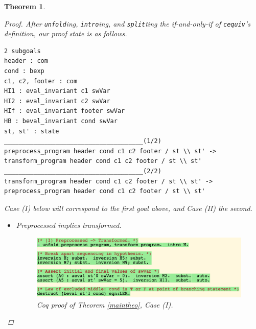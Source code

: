 \documentclass[12pt,notitlepage]{report}
\theoremstyle{plain}
\newtheorem{theo}{Theorem}[section]
\theoremstyle{definition}
\numberwithin{equation}{section}
\begin{document}
\begin{theo}
\begin{proof}
    \noindent After \verb$unfold$ing, \verb$intro$ing, and \verb$split$ting the if-and-only-if of \verb$cequiv$'s definition, our proof state is as follows.
    
    \begin{verbatim}
2 subgoals
header : com
cond : bexp
c1, c2, footer : com
HI1 : eval_invariant c1 swVar
HI2 : eval_invariant c2 swVar
HIf : eval_invariant footer swVar
HB : beval_invariant cond swVar
st, st' : state
______________________________________(1/2)
preprocess_program header cond c1 c2 footer / st \\ st' ->
transform_program header cond c1 c2 footer / st \\ st'
______________________________________(2/2)
transform_program header cond c1 c2 footer / st \\ st' ->
preprocess_program header cond c1 c2 footer / st \\ st'
    \end{verbatim}
    \noindent Case (I) below will correspond to the first goal above, and Case (II) the second.
    \begin{itemize}
        \item[(I)] Preprocessed implies transformed.\ \newline
        \noindent    \noindent\begin{figure}[H]
        \centering
        \includegraphics[scale=0.6]{alltrans_1}
        \caption{Coq proof of Theorem \ref{maintheo}, Case (I).}
        \label{fig:maintheo1}
        \end{figure}
        

\end{itemize}
\end{proof}
\end{theo}
\end{document}
